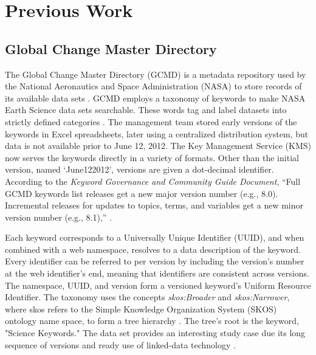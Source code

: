\section{Previous Work}

\subsection{Global Change Master Directory}
The Global Change Master Directory (GCMD) is a metadata repository used by the National Aeronautics and Space Administration (NASA) to store records of its available data sets \cite{Miled:2001:GCM:372202.372324}.
GCMD employs a taxonomy of keywords to make NASA Earth Science data sets searchable.
These words tag and label datasets into strictly defined categories \cite{GCMDKey}.
The management team stored early versions of the keywords in Excel spreadsheets, later using a centralized distribution system, but data is not available prior to June 12, 2012.
The Key Management Service (KMS) now serves the keywords directly in a variety of formats.
Other than the initial version, named `June122012', versions are given a dot-decimal identifier.
According to the \textit{Keyword Governance and Community Guide Document}, ``Full GCMD keywords list releases get a new major version number (e.g., 8.0). Incremental releases for updates to topics, terms, and variables get a new minor version number (e.g., 8.1),” \cite{gcmd_gov}.

Each keyword corresponds to a Universally Unique Identifier (UUID), and when combined with a web namespace, resolves to a data description of the keyword.
Every identifier can be referred to per version by including the version's number at the web identifier's end, meaning that identifiers are consistent across versions.
The namespace, UUID, and version form a versioned keyword's Uniform Resource Identifier.
The taxonomy uses the concepts \textit{skos:Broader} and \textit{skos:Narrower}, where skos refers to the Simple Knowledge Organization System (SKOS) ontology name space, to form a tree hierarchy \cite{skos}.
The tree's root is the keyword, "Science Keywords."
The data set provides an interesting study case due its long sequence of versions and ready use of linked-data technology \cite{Stevens2016}.


